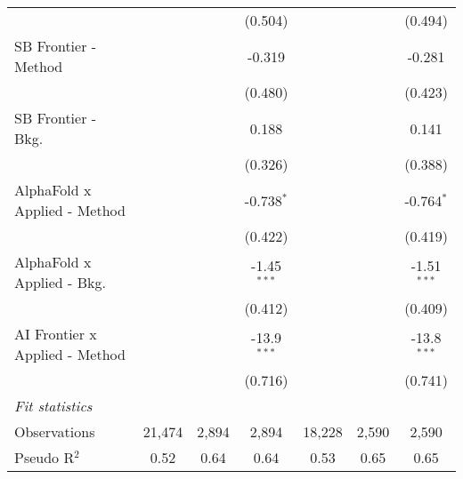 \begin{tabular}{lcccccc}
                                  &                &               & (0.504)       &                &               & (0.494)\\   
   SB Frontier - Method           &                &               & -0.319        &                &               & -0.281\\   
                                  &                &               & (0.480)       &                &               & (0.423)\\   
   SB Frontier - Bkg.             &                &               & 0.188         &                &               & 0.141\\   
                                  &                &               & (0.326)       &                &               & (0.388)\\   
   AlphaFold x Applied - Method   &                &               & -0.738$^{*}$  &                &               & -0.764$^{*}$\\   
                                  &                &               & (0.422)       &                &               & (0.419)\\   
   AlphaFold x Applied - Bkg.     &                &               & -1.45$^{***}$ &                &               & -1.51$^{***}$\\   
                                  &                &               & (0.412)       &                &               & (0.409)\\   
   AI Frontier x Applied - Method &                &               & -13.9$^{***}$ &                &               & -13.8$^{***}$\\   
                                  &                &               & (0.716)       &                &               & (0.741)\\   
   \midrule
   \emph{Fit statistics}\\
   Observations                   & 21,474         & 2,894         & 2,894         & 18,228         & 2,590         & 2,590\\  
   Pseudo R$^2$                   & 0.52           & 0.64          & 0.64          & 0.53           & 0.65          & 0.65\\  
   

\end{tabular}
